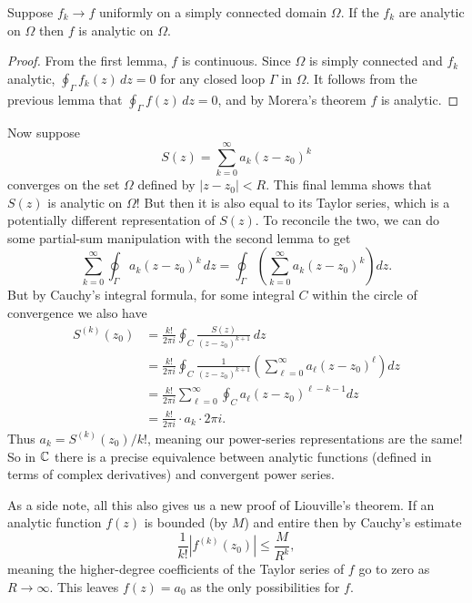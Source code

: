 \documentclass[../m136main.tex]{subfiles}
\begin{document}
\begin{lemma}[]
    Suppose $f_k \to f$ uniformly on a simply connected domain $\Omega$.
    If the $f_k$ are analytic on $\Omega$ then $f$ is analytic on $\Omega$.
\end{lemma}

\begin{proof}
    From the first lemma, $f$ is continuous.
    Since $\Omega$ is simply connected and $f_k$ analytic, $\oint_\Gamma f_k(z) \,dz = 0$ for any closed loop $\Gamma$ in $\Omega$.
    It follows from the previous lemma that $\oint_\Gamma f(z) \,dz = 0$, and by Morera's theorem $f$ is analytic.
\end{proof}

Now suppose
\[ S(z) = \sum_{k=0}^{\infty} a_k (z - z_0)^{k} \]
converges on the set $\Omega$ defined by $|z - z_0| < R$.
This final lemma shows that $S(z)$ is analytic on $\Omega$!
But then it is also equal to its Taylor series, which is a potentially different representation of $S(z)$.
To reconcile the two, we can do some partial-sum manipulation with the second lemma to get
\[ \sum_{k=0}^{\infty} \oint_\Gamma a_k(z - z_0)^k \,dz = \oint_\Gamma \left( \sum_{k=0}^{\infty} a_k (z - z_0)^k \right) dz. \]
But by Cauchy's integral formula, for some integral $C$ within the circle of convergence we also have
\begin{align*}
    S^{(k)}(z_0) &= \frac{k!}{2\pi i} \oint_C \frac{S(z)}{(z - z_0)^{k+1}} \,dz \\
    &= \frac{k!}{2\pi i} \oint_C \frac{1}{(z - z_0)^{k+1}} \left( \sum_{\ell = 0}^{\infty} a_\ell (z - z_0)^\ell \right) dz \\
    &= \frac{k!}{2\pi i} \sum_{\ell = 0}^{\infty} \oint_C a_\ell (z - z_0)^{\ell - k - 1} dz \\
    &= \frac{k!}{2\pi i} \cdot a_k \cdot 2\pi i.
\end{align*}
Thus $a_k = S^{(k)}(z_0) / k!$, meaning our power-series representations are the same!
So in $\mathbb{C}$ there is a precise equivalence between analytic functions (defined in terms of complex derivatives) and convergent power series.

As a side note, all this also gives us a new proof of Liouville's theorem.
If an analytic function $f(z)$ is bounded (by $M$) and entire then by Cauchy's estimate
\[ \frac{1}{k!} \left| f^{(k)}(z_0) \right| \leq \frac{M}{R^{k}}, \]
meaning the higher-degree coefficients of the Taylor series of $f$ go to zero as $R \to \infty$.
This leaves $f(z) = a_0$ as the only possibilities for $f$.
\end{document}
